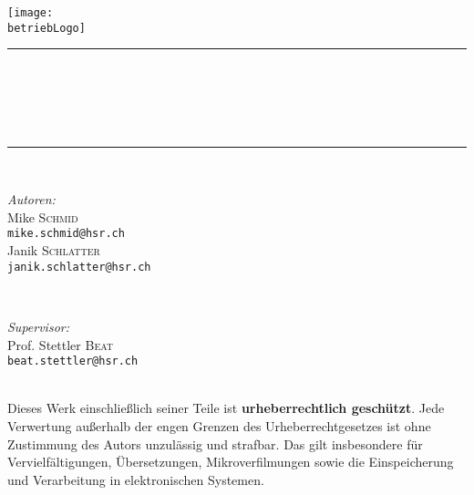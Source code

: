 \begin{titlepage}
    \begin{center}
        \texttt{[image: \\betriebLogo]}\\[10ex]

        \rule{\linewidth}{0.5mm}\\[2ex]
        {\huge \bfseries  \titel }\\[2ex]
        {\LARGE \untertitel }\\[2ex]
        {\large \datum}\\
        \rule{\linewidth}{0.5mm}\\[10ex]

        \begin{minipage}[t]{0.4\textwidth}
            \begin{flushleft} 
                \large \emph{Autoren:}\\
                    \large Mike \textsc{Schmid}\\
                    \scriptsize \texttt{mike.schmid@hsr.ch}\\[1ex]
                    \large Janik \textsc{Schlatter}\\
                    \scriptsize \texttt{janik.schlatter@hsr.ch}\\[1ex]
            \end{flushleft}
            \end{minipage}
            ~
            \begin{minipage}[t]{0.4\textwidth}
            \begin{flushright} 
                \large \emph{Supervisor:} \\
                Prof. Stettler \textsc{Beat}\\
                \scriptsize \texttt{beat.stettler@hsr.ch}\\[1ex]
            \end{flushright}
        \end{minipage}\\[40ex]

        \small
        \noindent
        Dieses Werk einschließlich seiner Teile ist \textbf{urheberrechtlich geschützt}.
        Jede Verwertung außerhalb der engen Grenzen des Urheberrechtgesetzes ist ohne
        Zustimmung des Autors unzulässig und strafbar. Das gilt insbesondere für
        Vervielfältigungen, Übersetzungen, Mikroverfilmungen sowie die Einspeicherung
        und Verarbeitung in elektronischen Systemen.

    \end{center}
\end{titlepage}